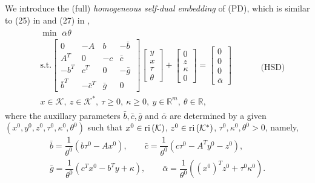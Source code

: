 \documentclass[10pt]{article}
\theoremstyle{definition}
\theoremstyle{plain}
\def\interior{\protect{\textnormal{ri}}}
\begin{document}
We introduce the (full) \textit{homogeneous self-dual embedding} of (PD), which is similar to (25) in \cite{SDPT3_2010} and (27) in \cite{CVX},
\begin{align*}
\begin{split}
& \min \,\, \bar{\alpha}\theta \\
& \text{s.t.} \begin{bmatrix}
0 & -A & b & -\bar b\ \\ 
A^T & 0 & -c & \bar c \\
-b^T & c^T& 0 & -\bar g \\
\bar b^T & -\bar c^T & \bar g & 0
\end{bmatrix}
\begin{bmatrix}
y \\ x \\ \tau \\ \theta
\end{bmatrix} + 
\begin{bmatrix}
0 \\ z \\ \kappa \\ 0 
\end{bmatrix} = 
\begin{bmatrix}
0 \\ 0 \\ 0 \\ \bar \alpha
\end{bmatrix}\\
& x \in \mathcal{K},\ z \in \mathcal{K}^*,\ \tau \geq 0,\ \kappa\geq 0,\ y \in \mathbb{R}^m,\ \theta \in \mathbb{R}, 
\end{split} \quad \quad \quad \text{(HSD)}
\end{align*}
where the auxillary parameters $\bar b, \bar c, \bar g$ and $\bar \alpha$ are determined by a given $(x^0, y^0, z^0, \tau^0, \kappa^0, \theta^0)$ such that $x^0 \in \interior \left(\mathcal{K}\right)$, $z^0 \in \interior \left(\mathcal{K}^*\right)$, $\tau^0, \kappa^0, \theta^0 > 0$, namely,
\begin{align*}
\bar b = \dfrac{1}{\theta^0}\left(b\tau^0 - Ax^0\right),\quad\quad  \bar c = \dfrac{1}{\theta^0}\left(c\tau^0 - A^Ty^0 - z^0\right), \\ 
\bar g = \dfrac{1}{\theta^0}\left(c^T x^0 - b^T y + \kappa\right), \quad\quad  \bar \alpha = \dfrac{1}{\theta^0}\left((x^0)^T z^0 + \tau^0\kappa^0\right).
\end{align*}
\end{document}
